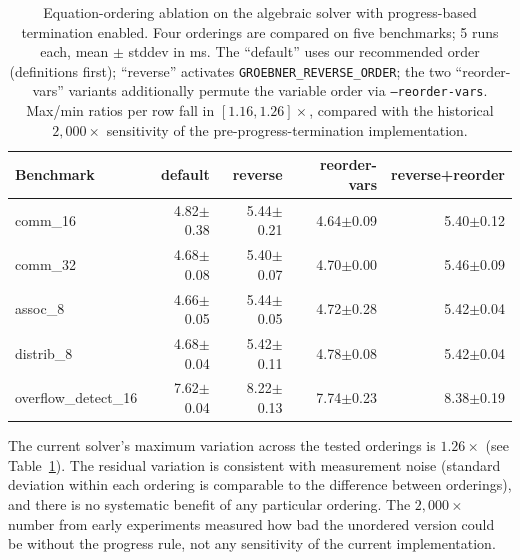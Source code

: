 \documentclass[runningheads]{llncs}
\begin{document}
\begin{table}[ht]
\caption{Equation-ordering ablation on the algebraic solver with
  progress-based termination enabled. Four orderings are compared
  on five benchmarks; 5 runs each, mean $\pm$ stddev in ms.
  The ``default'' uses our recommended order (definitions first);
  ``reverse'' activates \texttt{GROEBNER\_REVERSE\_ORDER}; the
  two ``reorder-vars'' variants additionally permute the variable
  order via \texttt{--reorder-vars}. Max/min ratios per row
  fall in $[1.16, 1.26]\times$, compared with the historical
  $2{,}000\times$ sensitivity of the pre-progress-termination
  implementation.}
\label{tab:ordering}
\centering
\small
\begin{tabular}{lrrrr}
\toprule
Benchmark & default & reverse & reorder-vars & reverse+reorder \\
\midrule
comm\_16 & 4.82$\pm$0.38 & 5.44$\pm$0.21 & 4.64$\pm$0.09 & 5.40$\pm$0.12 \\
comm\_32 & 4.68$\pm$0.08 & 5.40$\pm$0.07 & 4.70$\pm$0.00 & 5.46$\pm$0.09 \\
assoc\_8 & 4.66$\pm$0.05 & 5.44$\pm$0.05 & 4.72$\pm$0.28 & 5.42$\pm$0.04 \\
distrib\_8 & 4.68$\pm$0.04 & 5.42$\pm$0.11 & 4.78$\pm$0.08 & 5.42$\pm$0.04 \\
overflow\_detect\_16 & 7.62$\pm$0.04 & 8.22$\pm$0.13 & 7.74$\pm$0.23 & 8.38$\pm$0.19 \\
\bottomrule
\end{tabular}
\end{table}

The current solver's maximum variation across the tested
orderings is $1.26\times$ (see Table~\ref{tab:ordering}). The
residual variation is consistent with measurement noise (standard
deviation within each ordering is comparable to the difference
between orderings), and there is no systematic benefit of any
particular ordering. The $2{,}000\times$ number from early
experiments measured how bad the unordered version could be
without the progress rule, not any sensitivity of the current
implementation.
\end{document}
